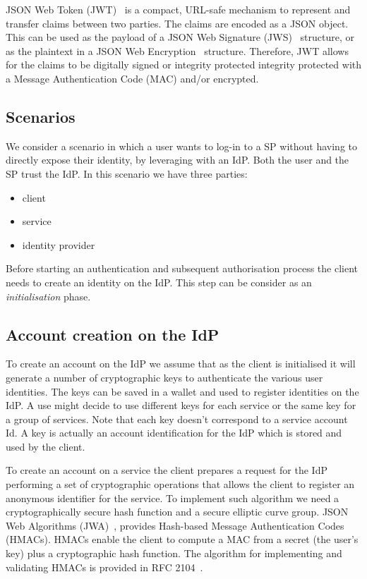 JSON Web Token (JWT)~\cite{jones2015json} is a compact, URL-safe mechanism to represent and transfer claims between two parties. The claims are encoded as a JSON object. This can be used as the payload of a JSON Web Signature (JWS)~\cite{jones2014n} structure, or as the plaintext in a JSON Web Encryption~\cite{jones2015jwe} structure. Therefore, JWT allows for the claims to be digitally signed or integrity protected integrity protected with a Message Authentication Code (MAC) and/or encrypted.

\subsection{Scenarios}

We consider a scenario in which a user wants to log-in to a SP without having to directly expose their identity, by leveraging with an IdP. Both the user and the SP trust the IdP. In this scenario we have three parties:
\begin{itemize}
    \item client
    \item service
    \item identity provider
\end{itemize}

Before starting an authentication and subsequent authorisation process the client needs to create an identity on the IdP. This step can be consider as an \emph{initialisation} phase.

\subsection{Account creation on the IdP}

To create an account on the IdP we assume that as the client is initialised it will generate a number of cryptographic keys to authenticate the various user identities. The keys can be saved in a wallet and used to register identities on the IdP. A use might decide to use different keys for each service or the same key for a group of services. Note that each key doesn't correspond to a service account Id. A key is actually an account identification for the IdP which is stored and used by the client.

To create an account on a service the client prepares a request for the IdP performing a set of cryptographic operations that allows the client to register an anonymous identifier for the service. To implement such algorithm we need a
cryptographically secure hash function and a secure elliptic curve group. JSON Web Algorithms (JWA)~\cite{jones2015jwa}, provides Hash-based Message Authentication Codes (HMACs). HMACs enable the client to compute a MAC from a secret (the user's key) plus a cryptographic hash function. The algorithm for implementing and validating HMACs is provided in RFC 2104~\cite{krawczyk1997rfc}.

